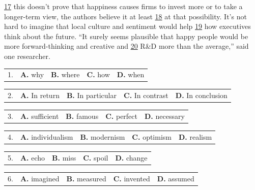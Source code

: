 \documentclass[UTF8,11pt]{ctexart}
\begin{document}
\uline{17} this doesn’t prove that happiness causes firms to invest more or to take a longer-term view, the authors believe it at least \uline{18} at that possibility. It’s not hard to imagine that local culture and sentiment would help \uline{19} how executives think about the future. “It surely seems plausible that happy people would be more forward-thinking and creative and \uline{20} R\&D more than the average,” said one researcher.


\noindent\begin{tabularx}{\linewidth}{@{}lXXXX@{}}1. & \textbf{A.} why & \textbf{B.} where & \textbf{C.} how & \textbf{D.} when\\\end{tabularx}\par

\noindent\begin{tabularx}{\linewidth}{@{}lXXXX@{}}2. & \textbf{A.} In return & \textbf{B.} In particular & \textbf{C.} In contrast & \textbf{D.} In conclusion\\\end{tabularx}\par

\noindent\begin{tabularx}{\linewidth}{@{}lXXXX@{}}3. & \textbf{A.} sufficient & \textbf{B.} famous & \textbf{C.} perfect & \textbf{D.} necessary\\\end{tabularx}\par

\noindent\begin{tabularx}{\linewidth}{@{}lXXXX@{}}4. & \textbf{A.} individualism & \textbf{B.} modernism & \textbf{C.} optimism & \textbf{D.} realism\\\end{tabularx}\par

\noindent\begin{tabularx}{\linewidth}{@{}lXXXX@{}}5. & \textbf{A.} echo & \textbf{B.} miss & \textbf{C.} spoil & \textbf{D.} change\\\end{tabularx}\par

\noindent\begin{tabularx}{\linewidth}{@{}lXXXX@{}}6. & \textbf{A.} imagined & \textbf{B.} measured & \textbf{C.} invented & \textbf{D.} assumed\\\end{tabularx}\par
\end{document}
